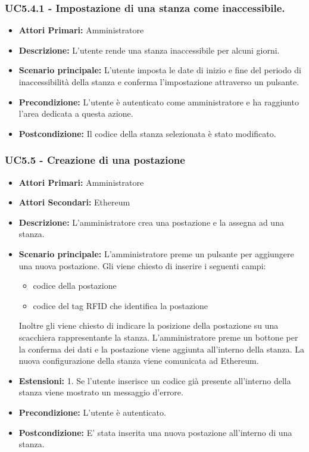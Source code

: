 \subsubsection{ UC5.4.1 - Impostazione di una stanza come inaccessibile.}
\begin{itemize}
	\item\textbf{Attori Primari:}
	Amministratore 
	\item\textbf{Descrizione:}
	L'utente rende una stanza inaccessibile per alcuni giorni.
	\item\textbf{Scenario principale:} 
	L'utente imposta le date di inizio e fine del periodo di inaccessibilità della stanza e conferma l'impostazione attraverso un pulsante.
	\item\textbf{Precondizione:} 
	L'utente è autenticato come amministratore e ha raggiunto l'area dedicata a questa azione.
	\item\textbf{Postcondizione:}
	Il codice della stanza selezionata è stato modificato.
\end{itemize}

\subsubsection{ UC5.5 - Creazione di una postazione}
\begin{itemize}
	\item\textbf{Attori Primari:}
	Amministratore 
	\item\textbf{Attori Secondari:}
	Ethereum
	\item\textbf{Descrizione:}
	L'amministratore crea una postazione e la assegna ad una stanza.
	\item\textbf{Scenario principale:} 
	L'amministratore preme un pulsante per aggiungere una nuova postazione. Gli viene chiesto di inserire i seguenti campi:
	\begin{itemize}
		\item{codice della postazione}
		\item{codice del tag RFID che identifica la postazione}
	\end{itemize}
	Inoltre gli viene chiesto di indicare la posizione della postazione su una scacchiera rappresentante la stanza.
	L'amministratore preme un bottone per la conferma dei dati e la postazione viene aggiunta all'interno della stanza. La nuova configurazione della stanza viene comunicata ad Ethereum.
	\item\textbf{Estensioni:}
	1. Se l'utente inserisce un codice già presente all'interno della stanza viene mostrato un messaggio d'errore.
	\item\textbf{Precondizione:} 
	L'utente è autenticato.
	\item\textbf{Postcondizione:}
	E' stata inserita una nuova postazione all'interno di una stanza.
\end{itemize}

